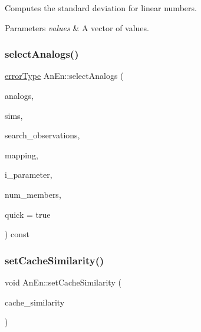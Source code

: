 Computes the standard deviation for linear numbers.


\begin{DoxyParams}{Parameters}
{\em values} & A vector of values. \\
\hline
\end{DoxyParams}
\mbox{\label{class_an_en_a8fdd1ef139e17ee4de3744f3913b6d7f}} 
\subsubsection{\texorpdfstring{select\+Analogs()}{selectAnalogs()}}
{\footnotesize\ttfamily \mbox{\hyperlink{class_an_en_a0e256eb89d102d318a47d936b02242bf}{error\+Type}} An\+En\+::select\+Analogs (\begin{DoxyParamCaption}\item[{\mbox{\hyperlink{class_analogs}{Analogs}} \&}]{analogs,  }\item[{\mbox{\hyperlink{class_similarity_matrices}{Similarity\+Matrices}} \&}]{sims,  }\item[{const \mbox{\hyperlink{class_observations__array}{Observations\+\_\+array}} \&}]{search\+\_\+observations,  }\item[{boost\+::numeric\+::ublas\+::matrix$<$ size\+\_\+t $>$}]{mapping,  }\item[{size\+\_\+t}]{i\+\_\+parameter,  }\item[{size\+\_\+t}]{num\+\_\+members,  }\item[{bool}]{quick = {\ttfamily true} }\end{DoxyParamCaption}) const}

\mbox{\label{class_an_en_a46995cfbe45b9724a734f3a1a28f1681}} 
\subsubsection{\texorpdfstring{set\+Cache\+Similarity()}{setCacheSimilarity()}}
{\footnotesize\ttfamily void An\+En\+::set\+Cache\+Similarity (\begin{DoxyParamCaption}\item[{std\+::string}]{cache\+\_\+similarity }\end{DoxyParamCaption})}

